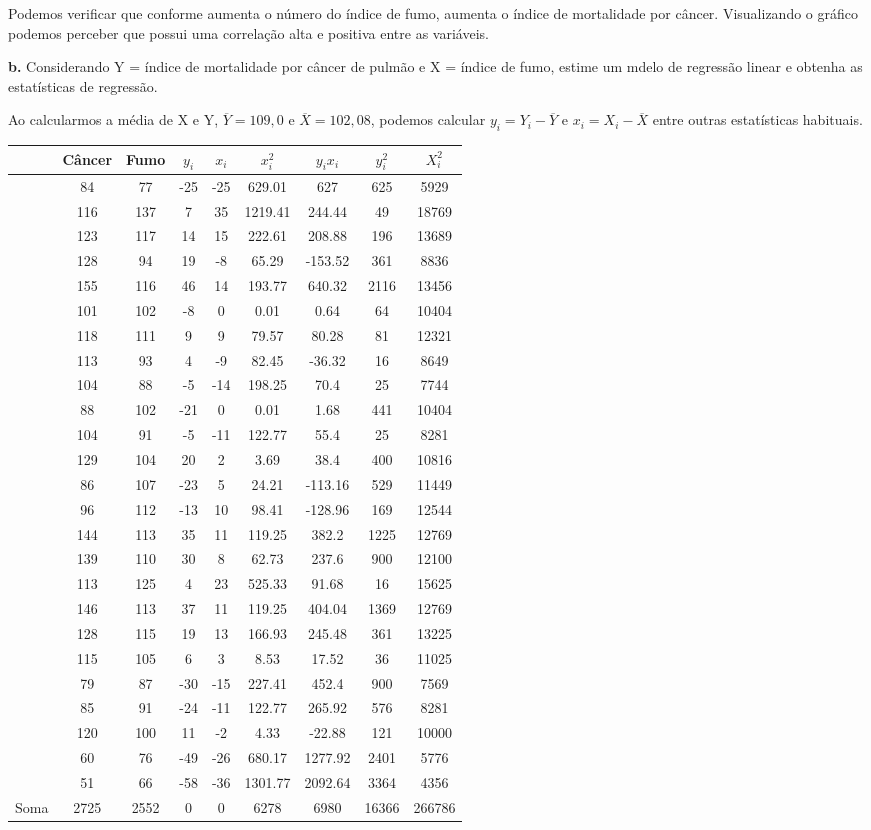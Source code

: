 \documentclass[
]{book}
\begin{document}
Podemos verificar que conforme aumenta o número do índice de fumo, aumenta o índice de mortalidade por câncer. Visualizando o gráfico podemos perceber que possui uma correlação alta e positiva entre as variáveis.

\textbf{b.} Considerando Y = índice de mortalidade por câncer de pulmão e X = índice de fumo, estime um mdelo de regressão linear e obtenha as estatísticas de regressão.

Ao calcularmos a média de X e Y, \(\overline{Y}=109,0\) e \(\overline{X}=102,08\), podemos calcular \(y_i=Y_i-\overline{Y}\) e \(x_i=X_i-\overline{X}\) entre outras estatísticas habituais.

\begin{longtable}[]{@{}lcccccccc@{}}
\toprule
& Câncer & Fumo & \(y_i\) & \(x_i\) & \(x^2_i\) & \(y_ix_i\) & \(y^2_i\) & \(X^2_i\)\tabularnewline
\midrule
\endhead
& 84 & 77 & -25 & -25 & 629.01 & 627 & 625 & 5929\tabularnewline
& 116 & 137 & 7 & 35 & 1219.41 & 244.44 & 49 & 18769\tabularnewline
& 123 & 117 & 14 & 15 & 222.61 & 208.88 & 196 & 13689\tabularnewline
& 128 & 94 & 19 & -8 & 65.29 & -153.52 & 361 & 8836\tabularnewline
& 155 & 116 & 46 & 14 & 193.77 & 640.32 & 2116 & 13456\tabularnewline
& 101 & 102 & -8 & 0 & 0.01 & 0.64 & 64 & 10404\tabularnewline
& 118 & 111 & 9 & 9 & 79.57 & 80.28 & 81 & 12321\tabularnewline
& 113 & 93 & 4 & -9 & 82.45 & -36.32 & 16 & 8649\tabularnewline
& 104 & 88 & -5 & -14 & 198.25 & 70.4 & 25 & 7744\tabularnewline
& 88 & 102 & -21 & 0 & 0.01 & 1.68 & 441 & 10404\tabularnewline
& 104 & 91 & -5 & -11 & 122.77 & 55.4 & 25 & 8281\tabularnewline
& 129 & 104 & 20 & 2 & 3.69 & 38.4 & 400 & 10816\tabularnewline
& 86 & 107 & -23 & 5 & 24.21 & -113.16 & 529 & 11449\tabularnewline
& 96 & 112 & -13 & 10 & 98.41 & -128.96 & 169 & 12544\tabularnewline
& 144 & 113 & 35 & 11 & 119.25 & 382.2 & 1225 & 12769\tabularnewline
& 139 & 110 & 30 & 8 & 62.73 & 237.6 & 900 & 12100\tabularnewline
& 113 & 125 & 4 & 23 & 525.33 & 91.68 & 16 & 15625\tabularnewline
& 146 & 113 & 37 & 11 & 119.25 & 404.04 & 1369 & 12769\tabularnewline
& 128 & 115 & 19 & 13 & 166.93 & 245.48 & 361 & 13225\tabularnewline
& 115 & 105 & 6 & 3 & 8.53 & 17.52 & 36 & 11025\tabularnewline
& 79 & 87 & -30 & -15 & 227.41 & 452.4 & 900 & 7569\tabularnewline
& 85 & 91 & -24 & -11 & 122.77 & 265.92 & 576 & 8281\tabularnewline
& 120 & 100 & 11 & -2 & 4.33 & -22.88 & 121 & 10000\tabularnewline
& 60 & 76 & -49 & -26 & 680.17 & 1277.92 & 2401 & 5776\tabularnewline
& 51 & 66 & -58 & -36 & 1301.77 & 2092.64 & 3364 & 4356\tabularnewline
Soma & 2725 & 2552 & 0 & 0 & 6278 & 6980 & 16366 & 266786\tabularnewline
\bottomrule
\end{longtable}
\end{document}
